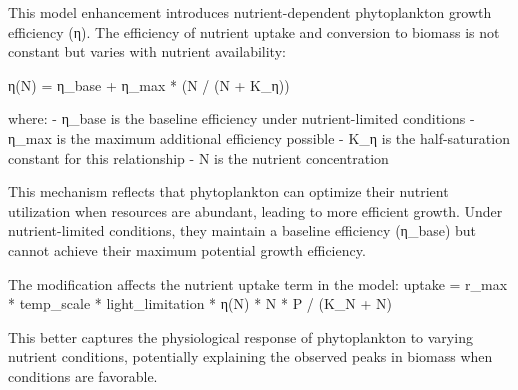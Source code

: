 This model enhancement introduces nutrient-dependent phytoplankton growth efficiency (η). The efficiency of nutrient uptake and conversion to biomass is not constant but varies with nutrient availability:

η(N) = η_base + η_max * (N / (N + K_η))

where:
- η_base is the baseline efficiency under nutrient-limited conditions
- η_max is the maximum additional efficiency possible
- K_η is the half-saturation constant for this relationship
- N is the nutrient concentration

This mechanism reflects that phytoplankton can optimize their nutrient utilization when resources are abundant, leading to more efficient growth. Under nutrient-limited conditions, they maintain a baseline efficiency (η_base) but cannot achieve their maximum potential growth efficiency.

The modification affects the nutrient uptake term in the model:
uptake = r_max * temp_scale * light_limitation * η(N) * N * P / (K_N + N)

This better captures the physiological response of phytoplankton to varying nutrient conditions, potentially explaining the observed peaks in biomass when conditions are favorable.
